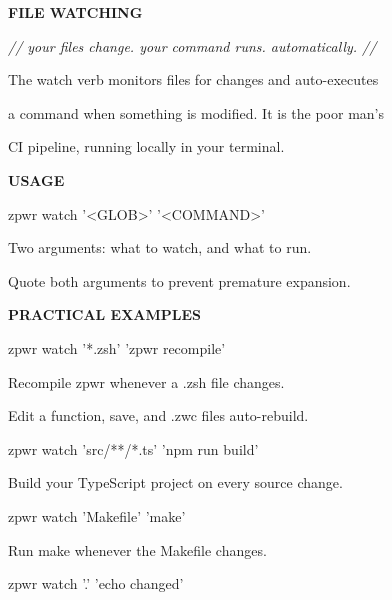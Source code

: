 \documentclass[11pt,a4paper,twoside]{book}
\begin{document}
\vspace{10pt}
{\large\bfseries\color{neoncyan} FILE WATCHING}\vspace{6pt}

{\small\itshape\color{dimtext} // your files change. your command runs. automatically. //}

The watch verb monitors files for changes and auto-executes

a command when something is modified. It is the poor man's

\begin{codebox}
CI pipeline, running locally in your terminal.\\
\end{codebox}


\vspace{12pt}
{\bfseries\color{neonyellow} USAGE}\vspace{4pt}

\begin{codebox}
zpwr watch '<GLOB>' '<COMMAND>'\\
\end{codebox}

Two arguments: what to watch, and what to run.

Quote both arguments to prevent premature expansion.


\vspace{12pt}
{\bfseries\color{neonyellow} PRACTICAL EXAMPLES}\vspace{4pt}

\begin{codebox}
zpwr watch '*.zsh' 'zpwr recompile'\\
\end{codebox}

Recompile zpwr whenever a .zsh file changes.

Edit a function, save, and .zwc files auto-rebuild.

\begin{codebox}
zpwr watch 'src/**/*.ts' 'npm run build'\\
\end{codebox}

Build your TypeScript project on every source change.

\begin{codebox}
zpwr watch 'Makefile' 'make'\\
\end{codebox}

Run make whenever the Makefile changes.

\begin{codebox}
zpwr watch '.' 'echo changed'\\
\end{codebox}
\end{document}
